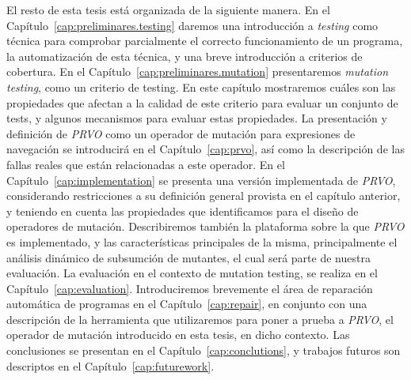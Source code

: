 El resto de esta tesis est\'a organizada de la siguiente manera. En el Cap\'itulo~\ref{cap:preliminares.testing} daremos una introducci\'on a \emph{testing} como t\'ecnica para comprobar parcialmente el correcto funcionamiento de un programa, la automatizaci\'on de esta t\'ecnica, y una breve introducci\'on a criterios de cobertura. En el Cap\'itulo~\ref{cap:preliminares.mutation} presentaremos \emph{mutation testing}, como un criterio de testing. En este cap\'itulo mostraremos cu\'ales son las propiedades que afectan a la calidad de este criterio para evaluar un conjunto de tests, y algunos mecanismos para evaluar estas propiedades. La presentaci\'on y definici\'on de \emph{PRVO} como un operador de mutaci\'on para expresiones de navegaci\'on se introducir\'a en el Cap\'itulo~\ref{cap:prvo}, as\'i como la descripci\'on de las fallas reales que est\'an relacionadas a este operador. En el Cap\'itulo~\ref{cap:implementation} se presenta una versi\'on implementada de \emph{PRVO}, considerando restricciones a su definici\'on general provista en el cap\'itulo anterior, y teniendo en cuenta las propiedades que identificamos para el dise\~no de operadores de mutaci\'on. Describiremos tambi\'en la plataforma sobre la que \emph{PRVO} es implementado, y las caracter\'isticas principales de la misma, principalmente el an\'alisis din\'amico de subsumci\'on de mutantes, el cual ser\'a parte de nuestra evaluaci\'on. La evaluaci\'on en el contexto de mutation testing, se realiza en el Cap\'itulo~\ref{cap:evaluation}. Introduciremos brevemente el \'area de reparaci\'on autom\'atica de programas en el Cap\'itulo~\ref{cap:repair}, en conjunto con una descripci\'on de la herramienta que utilizaremos para poner a prueba a \emph{PRVO}, el operador de mutaci\'on introducido en esta tesis, en dicho contexto. Las conclusiones se presentan en el Cap\'itulo~\ref{cap:conclutions}, y trabajos futuros son descriptos en el Cap\'itulo~\ref{cap:futurework}.

